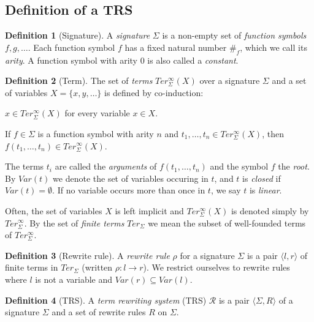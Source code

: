 \documentclass[11pt,oneside,a4paper,final]{report}
\theoremstyle{definition}
\newtheorem{definition}{Definition}
\begin{document}
\subsection{Definition of a TRS}

\begin{definition}[Signature]
A \emph{signature} $\Sigma$ is a non-empty set of \emph{function symbols} $f,
g, \ldots$. Each function symbol $f$ has a fixed natural number $\#_f$, which
we call its \emph{arity}. A function symbol with arity $0$ is also called a
\emph{constant}.
\end{definition}

\begin{definition}[Term]
The set of \emph{terms} $Ter_\Sigma^\infty(X)$ over a signature $\Sigma$ and a
set of variables $X = \{x, y, \ldots\}$ is defined by co-induction:
\begin{compactenum}
  \item
    $x \in Ter_\Sigma^\infty(X)$ for every variable $x \in X$.
  \item
    If $f \in \Sigma$ is a function symbol with arity $n$ and $t_1, \ldots,
    t_n \in Ter_\Sigma^\infty(X)$, then $f(t_1, \ldots, t_n) \in
    Ter_\Sigma^\infty(X)$.
\end{compactenum}
\end{definition}

The terms $t_i$ are called the \emph{arguments} of $f(t_1, \ldots, t_n)$ and
the symbol $f$ the \emph{root}. By $Var(t)$ we denote the set of variables
occuring in $t$, and $t$ is \emph{closed} if $Var(t) = \emptyset$. If no
variable occurs more than once in $t$, we say $t$ is \emph{linear}.

Often, the set of variables $X$ is left implicit and $Ter_\Sigma^\infty(X)$ is
denoted simply by $Ter_\Sigma^\infty$. By the set of \emph{finite terms}
$Ter_\Sigma$ we mean the subset of well-founded terms of $Ter_\Sigma^\infty$.

\begin{definition}[Rewrite rule]
  A \emph{rewrite rule} $\rho$ for a signature $\Sigma$ is a pair $\langle l,
  r \rangle$ of finite terms in $Ter_\Sigma$ (written $\rho : l \rightarrow
  r$). We restrict ourselves to rewrite rules where $l$ is not a variable and
  $Var(r) \subseteq Var(l)$.
\end{definition}

\begin{definition}[TRS]
A \emph{term rewriting system} (TRS) $\mathcal{R}$ is a pair $\langle \Sigma,
R \rangle$ of a signature $\Sigma$ and a set of rewrite rules $R$ on
$\Sigma$.
\end{definition}
\end{document}

